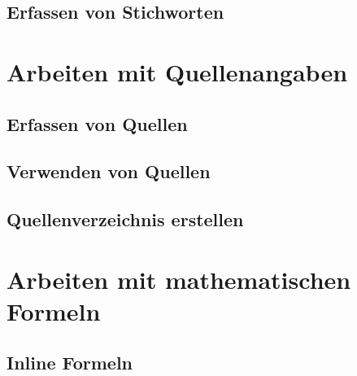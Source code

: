 \documentclass[12pt, a4paper, sectionentrydots=true, listof=totoc, listof=entryprefix, numbers=endperiod]{scrartcl}
\begin{document}
\subsection{Erfassen von Stichworten}
\begin{spacing}{1.25}

\end{spacing}
%
%
%
%
%
%
\pagebreak 
\section{Arbeiten mit Quellenangaben}
\begin{spacing}{1.25}

\end{spacing}
%
%
\subsection{Erfassen von Quellen}
\begin{spacing}{1.25}

\end{spacing}
%
%
\subsection{Verwenden von Quellen}
\begin{spacing}{1.25}

\end{spacing}
%
%
\subsection{Quellenverzeichnis erstellen}
\begin{spacing}{1.25}

\end{spacing}
%
%
%
%
%
%
\section{Arbeiten mit mathematischen Formeln}
\begin{spacing}{1.25}

\end{spacing}
%
%
\subsection{Inline Formeln}
\begin{spacing}{1.25}

\end{spacing}
%
%
\end{document}
